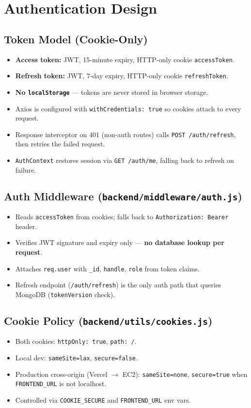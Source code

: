 \documentclass[11pt,a4paper]{article}
\begin{document}
\section{Authentication Design}

\subsection{Token Model (Cookie-Only)}
\begin{itemize}[noitemsep]
  \item \textbf{Access token:} JWT, 15-minute expiry, HTTP-only cookie \texttt{accessToken}.
  \item \textbf{Refresh token:} JWT, 7-day expiry, HTTP-only cookie \texttt{refreshToken}.
  \item \textbf{No \texttt{localStorage}} --- tokens are never stored in browser storage.
  \item Axios is configured with \texttt{withCredentials: true} so cookies attach to every request.
  \item Response interceptor on 401 (non-auth routes) calls \texttt{POST /auth/refresh}, then retries the failed request.
  \item \texttt{AuthContext} restores session via \texttt{GET /auth/me}, falling back to refresh on failure.
\end{itemize}

\subsection{Auth Middleware (\texttt{backend/middleware/auth.js})}
\begin{itemize}[noitemsep]
  \item Reads \texttt{accessToken} from cookies; falls back to \texttt{Authorization: Bearer} header.
  \item Verifies JWT signature and expiry only --- \textbf{no database lookup per request}.
  \item Attaches \texttt{req.user} with \texttt{\_id}, \texttt{handle}, \texttt{role} from token claims.
  \item Refresh endpoint (\texttt{/auth/refresh}) is the only auth path that queries MongoDB (\texttt{tokenVersion} check).
\end{itemize}

\subsection{Cookie Policy (\texttt{backend/utils/cookies.js})}
\begin{itemize}[noitemsep]
  \item Both cookies: \texttt{httpOnly: true}, \texttt{path: /}.
  \item Local dev: \texttt{sameSite=lax}, \texttt{secure=false}.
  \item Production cross-origin (Vercel $\rightarrow$ EC2): \texttt{sameSite=none}, \texttt{secure=true} when \texttt{FRONTEND\_URL} is not localhost.
  \item Controlled via \texttt{COOKIE\_SECURE} and \texttt{FRONTEND\_URL} env vars.
\end{itemize}
\end{document}
